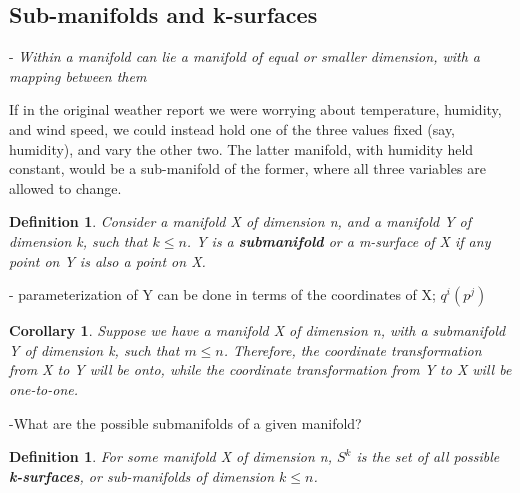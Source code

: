 \documentclass{book}
\newtheorem{defn}[equation]{Definition}
\newtheorem{coro}[equation]{Corollary}
\begin{document}
\subsection{Sub-manifolds and k-surfaces}

- \emph{Within a manifold can lie a manifold of equal or smaller dimension, with a mapping between them}

If in the original weather report we were worrying about temperature, humidity, and wind speed, we could instead hold one of the three values fixed (say, humidity), and vary the other two. The latter manifold, with humidity held constant, would be a sub-manifold of the former, where all three variables are allowed to change.  



\begin{defn}
	Consider a manifold X of dimension n, and a manifold Y of dimension k, such that $k \leq n$. Y is a \textbf{submanifold} or a m-surface of X if any point on Y is also a point on X. 
\end{defn}

- parameterization of Y can be done in terms of the coordinates of X; $q^i(p^j)$



\begin{coro}
	Suppose we have a manifold X of dimension n, with a submanifold Y of dimension k, such that $m \leq n$. Therefore, the coordinate transformation from X to Y will be onto, while the coordinate transformation from Y to X will be one-to-one. 
\end{coro}


-What are the possible submanifolds of a given manifold?


\begin{defn}
	For some manifold X of dimension n, $S^k$ is the set of all possible \textbf{k-surfaces}, or sub-manifolds of dimension $k \leq n$. 
\end{defn}
\end{document}
